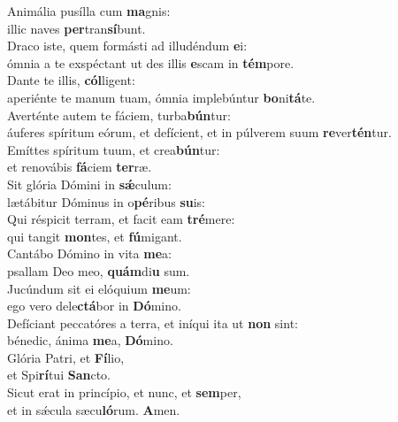 \oddverse Animália pusílla cum \textbf{ma}gnis:~\*\\
\oddverse illic naves \textbf{per}tran\textbf{sí}bunt.\\
\evenverse Draco iste, quem formásti ad illudéndum \textbf{e}i:~\*\\
\evenverse ómnia a te exspéctant ut des illis \textbf{e}scam in \textbf{tém}pore.\\
\oddverse Dante te illis, \textbf{cól}ligent:~\*\\
\oddverse aperiénte te manum tuam, ómnia implebúntur \textbf{bo}ni\textbf{tá}te.\\
\evenverse Averténte autem te fáciem, turba\textbf{bún}tur:~\*\\
\evenverse áuferes spíritum eórum, et defícient, et in púlverem suum \textbf{re}ver\textbf{tén}tur.\\
\oddverse Emíttes spíritum tuum, et crea\textbf{bún}tur:~\*\\
\oddverse et renovábis \textbf{fá}ciem \textbf{ter}ræ.\\
\evenverse Sit glória Dómini in \textbf{sǽ}culum:~\*\\
\evenverse lætábitur Dóminus in o\textbf{pé}ribus \textbf{su}is:\\
\oddverse Qui réspicit terram, et facit eam \textbf{tré}mere:~\*\\
\oddverse qui tangit \textbf{mon}tes, et \textbf{fú}migant.\\
\evenverse Cantábo Dómino in vita \textbf{me}a:~\*\\
\evenverse psallam Deo meo, \textbf{quám}di\textbf{u} sum.\\
\oddverse Jucúndum sit ei elóquium \textbf{me}um:~\*\\
\oddverse ego vero dele\textbf{ctá}bor in \textbf{Dó}mino.\\
\evenverse Defíciant peccatóres a terra, et iníqui ita ut \textbf{non} sint:~\*\\
\evenverse bénedic, ánima \textbf{me}a, \textbf{Dó}mino.\\
\oddverse Glória Patri, et \textbf{Fí}lio,~\*\\
\oddverse et Spi\textbf{rí}tui \textbf{San}cto.\\
\evenverse Sicut erat in princípio, et nunc, et \textbf{sem}per,~\*\\
\evenverse et in sǽcula sæcu\textbf{ló}rum. \textbf{A}men.\\
